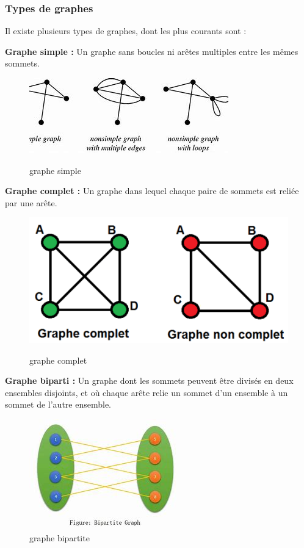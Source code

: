 \newpage
\subsubsection{Types de graphes}

Il existe plusieurs types de graphes, dont les plus courants sont :


\textbf{Graphe simple :} Un graphe sans boucles ni arêtes multiples entre les mêmes sommets.
\begin{figure}[h]
    \centering
    \includegraphics[width=0.4\linewidth]{Images/simple_graph.jpeg}
    \caption{graphe simple}
    \cite{graph_image3}
\end{figure}

\textbf{Graphe complet :} Un graphe dans lequel chaque paire de sommets est reliée par une arête.

\begin{figure}[h]
    \centering
    \includegraphics[width=0.4\linewidth]{Images/graph_simple_complet.png}
    \caption{graphe complet}

    \cite{graph_image4}
\end{figure}

\textbf{Graphe biparti :} Un graphe dont les sommets peuvent être divisés en deux ensembles disjoints, et où chaque arête relie un sommet d'un ensemble à un sommet de l'autre ensemble.

\begin{figure}[h]
    \centering
    \includegraphics[width=0.4\linewidth]{Images/bipartite_graph.jpeg}
    \caption{graphe bipartite}
\end{figure}





